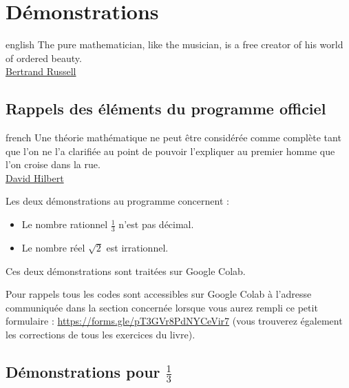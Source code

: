 \documentclass[a4paper, 11pt, twoside]{book}
\begin{document}
\part{Démonstrations}
\label{sec:org2c84789}
\startcontents[level-1]
\begin{foreigndisplayquote}{english}
The pure mathematician, like the musician, is a free creator of his
world of ordered beauty.\\

\href{https://amzn.to/3ONEWLI}{Bertrand Russell}
\end{foreigndisplayquote}

\chapter{Rappels des éléments du programme officiel}
\label{sec:orgaf7bf45}
\startcontents[level-2]

\begin{foreigndisplayquote}{french}
Une théorie mathématique ne peut être considérée comme complète
tant que l'on ne l'a clarifiée au point de pouvoir l'expliquer au
premier homme que l'on croise dans la rue.\\

\href{https://fr.wikipedia.org/wiki/David\_Hilbert}{David Hilbert}  
\end{foreigndisplayquote}

Les deux démonstrations au programme concernent :
\begin{itemize}
\item Le nombre rationnel \(\frac{1}{3}\) n'est pas décimal.
\item Le nombre réel \(\sqrt{2}\) est irrationnel.
\end{itemize}

Ces deux démonstrations sont traitées sur Google Colab.

Pour rappels tous les codes sont accessibles sur Google Colab à
l'adresse communiquée dans la section concernée lorsque vous
aurez rempli ce petit formulaire :
\url{https://forms.gle/pT3GVr8PdNYCeVir7} (vous trouverez également
les corrections de tous les exercices du livre).
\stopcontents[level-2]

\chapter{Démonstrations pour \(\frac{1}{3}\)}
\label{sec:org9a945ab}
\startcontents[level-2]
\end{document}
